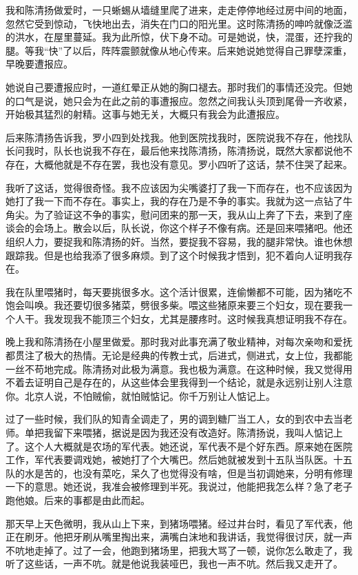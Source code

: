  我和陈清扬做爱时，一只蜥蜴从墙缝里爬了进来，走走停停地经过房中间的地面，忽然它受到惊动，飞快地出去，消失在门口的阳光里。这时陈清扬的呻吟就像泛滥的洪水，在屋里蔓延。我为此所惊，伏下身不动。可是她说，快，混蛋，还拧我的腿。等我“快”了以后，阵阵震颤就像从地心传来。后来她说她觉得自己罪孽深重，早晚要遭报应。 
 
 她说自己要遭报应时，一道红晕正从她的胸口褪去。那时我们的事情还没完。但她的口气是说，她只会为在此之前的事遭报应。忽然之间我认头顶到尾骨一齐收紧，开始极其猛烈的射精。这事与她无关，大概只有我会为此遭报应。 
 
 后来陈清扬告诉我，罗小四到处找我。他到医院找我时，医院说我不存在，他找队长问我时，队长也说我不存在，最后他来找陈清扬，陈清扬说，既然大家都说他不存在，大概他就是不存在罢，我也没有意见。罗小四听了这话，禁不住哭了起来。 
 
 我听了这话，觉得很奇怪。我不应该因为尖嘴婆打了我一下而存在，也不应该因为她打了我一下而不存在。事实上，我的存在乃是不争的事实。我就为这一点钻了牛角尖。为了验证这不争的事实，慰问团来的那一天，我从山上奔了下去，来到了座谈会的会场上。散会以后，队长说，你这个样子不像有病。还是回来喂猪吧。他还组织人力，要捉我和陈清扬的奸。当然，要捉我不容易，我的腿非常快。谁也休想跟踪我。但是也给我添了很多麻烦。到了这个时候我才悟到，犯不着向人证明我存在。 
 
 我在队里喂猪时，每天要挑很多水。这个活计很累，连偷懒都不可能，因为猪吃不饱会叫唤。我还要切很多猪菜，劈很多柴。喂这些猪原来要三个妇女，现在要我一个人干。我发现我不能顶三个妇女，尤其是腰疼时。这时候我真想证明我不存在。 
 
 晚上我和陈清扬在小屋里做爱。那时我对此事充满了敬业精神，对每次亲吻和爱抚都贯注了极大的热情。无论是经典的传教士式，后进式，侧进式，女上位，我都能一丝不苟地完成。陈清扬对此极为满意。我也极为满意。在这种时候，我又觉得用不着去证明自己是存在的，从这些体会里我得到一个结论，就是永远别让别人注意你。北京人说，不怕贼偷，就怕贼惦记。你千万别让人惦记上。 
 
 过了一些时候，我们队的知青全调走了，男的调到糖厂当工人，女的到农中去当老师。单把我留下来喂猪，据说是因为我还没有改造好。陈清扬说，我叫人惦记上了。这个人大概就是农场的军代表。她还说，军代表不是个好东西。原来她在医院工作，军代表要调戏她，被她打了个大嘴巴。然后她就被发到十五队当队医。十五队的水是苦的，也没有菜吃，呆久了也觉得没有啥，但是当初调她来，分明有修理一下的意思。她还说，我准会被修理到半死。我说过，他能把我怎么样？急了老子跑他娘。后来的事都是由此而起。 
 
 那天早上天色微明，我从山上下来，到猪场喂猪。经过井台时，看见了军代表，他正在刷牙。他把牙刷从嘴里掏出来，满嘴白沫地和我讲话，我觉得很讨厌，就一声不吭地走掉了。过了一会，他跑到猪场里，把我大骂了一顿，说你怎么敢走了，我听了这些话，一声不吭。就是他说我装哑巴，我也一声不吭。然后我又走开了。 
 
